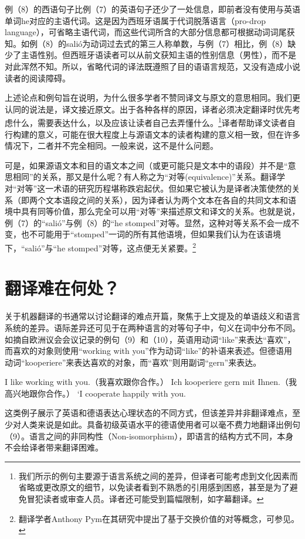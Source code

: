 \documentclass[output=paper]{langscibook}
\begin{document}
例（8）的西语句子比例（7）的英语句子还少了一处信息，即前者没有使用与英语单词he对应的主语代词。这是因为西班牙语属于代词脱落语言（pro-drop language），可省略主语代词，而这些代词所含的大部分信息都可根据动词词尾获知。如例（8）的salió为动词过去式的第三人称单数，与例（7）相比，例（8）缺少了主语性别。但西班牙语读者可以从前文获知主语的性别信息（男性），而不是对此浑然不知。所以，省略代词的译法既遵照了目的语语言规范，又没有造成小说读者的阅读障碍。

上述论点和例句旨在说明，为什么很多学者不赞同译文与原文的意思相同。我们更认同的说法是，译文接近原文。出于各种各样的原因，译者必须决定翻译时优先考虑什么，需要表达什么，以及应该让读者自己去弄懂什么。\footnote{我们所示的例句主要源于语言系统之间的差异，但译者可能考虑到文化因素而省略或更改原文的细节，以免读者看到不熟悉的引用感到困惑，甚至是为了避免冒犯读者或审查人员。译者还可能受到篇幅限制，如字幕翻译。}译者帮助译文读者自行构建的意义，可能在很大程度上与源语文本的读者构建的意义相一致，但在许多情况下，二者并不完全相同。一般来说，这不是什么问题。

可是，如果源语文本和目的语文本之间（或更可能只是文本中的语段）并不是“意思相同”的关系，那又是什么呢？有人称之为“对等(equivalence)”关系。翻译学对“对等”这一术语的研究历程堪称跌宕起伏。但如果它被认为是译者决策使然的关系（即两个文本语段之间的关系），因为译者认为两个文本在各自的共同文本和语境中具有同等价值，那么完全可以用“对等”来描述原文和译文的关系。也就是说，例（7）的“salió”与例（8）的“he stomped”对等。显然，这种对等关系不会一成不变，也不可能用于“stomped”一词的所有其他语境，但如果我们认为在该语境下，“salió”与“he stomped”对等，这点便无关紧要。\footnote{翻译学者Anthony Pym在其研究中提出了基于交换价值的对等概念，可参见\citet{Pym2010}。}

\section{翻译难在何处？}
关于机器翻译的书通常以讨论翻译的难点开篇，聚焦于上文提及的单语歧义和语言系统的差异。语际差异还可见于在两种语言的对等句子中，句义在词中分布不同。如摘自欧洲议会会议记录的例句（9）和（10），英语用动词“like”来表达“喜欢”，而喜欢的对象则使用“working with you”作为动词“like”的补语来表述。但德语用动词“kooperiere”来表达喜欢的对象，而“喜欢”则用副词“gern”来表达。

\ea I like working with you.（我喜欢跟你合作。）
\ex Ich kooperiere gern mit Ihnen.（我高兴地跟你合作。）
\glt ‘I cooperate happily with you.
\z

这类例子展示了英语和德语表达心理状态的不同方式，但该差异并非翻译难点，至少对人类来说是如此。具备初级英语水平的德语使用者可以毫不费力地翻译出例句（9）。语言之间的非同构性（Non-isomorphism），即语言的结构方式不同，本身不会给译者带来翻译困难。
\end{document}
